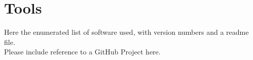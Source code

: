 \section{Tools}

Here the enumerated list of software used, with version numbers and a readme file.\\
Please include reference to a GitHub Project here.\\